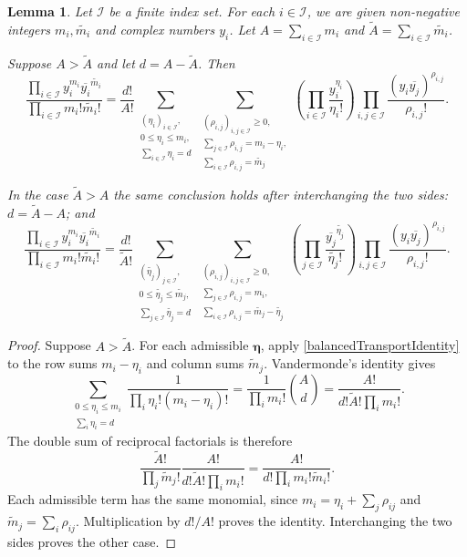 \documentclass[oneside, 12pt]{amsart}
\newtheorem{lem}[thm]{Lemma}
\theoremstyle{definition}
\begin{document}
	\begin{lem}\label{unbalancedTransportLemma}
		Let $\mathcal{I}$ be a finite index set. For each $i\in \mathcal{I}$, we are given non-negative integers $m_i, \widetilde{m_i}$ and complex numbers $y_i$. Let $A=\sum_{i \in \mathcal{I}} m_i$ and $\widetilde{A}=\sum_{i \in \mathcal{I}} \widetilde{m_i}$. 
		
		Suppose $A>\widetilde{A}$ and let $d=A-\widetilde{A}$. Then $$\frac{\prod_{i \in \mathcal{I}} y_i^{m_i}\overline{y_i}^{\widetilde{m_i}}}{\prod_{i \in \mathcal{I}} m_i!\widetilde{m_i}!}=\frac{d!}{A!}\sum_{\substack{(\eta_i)_{i \in \mathcal{I}}, \\ 0\leq \eta_i\leq m_i, \\ \sum_{i \in \mathcal{I}} \eta_i = d}} \sum_{\substack{(\rho_{i,j})_{i,j \in \mathcal{I}} \geq 0, \\ \sum_{j\in \mathcal{I}} \rho_{i,j}=m_i-\eta_i, \\ \sum_{i \in \mathcal{I}} \rho_{i,j} = \widetilde{m_j} }} \left(\prod_{i \in \mathcal{I}} \frac{y_i^{\eta_i}}{\eta_i!}\right) \prod_{i,j \in \mathcal{I}} \frac{(y_i\overline{y_j})^{\rho_{i,j}}}{\rho_{i,j}!}.$$
		
		In the case $\widetilde{A}>A$ the same conclusion holds {after interchanging the two sides}: $d=\widetilde{A}-A$; and $$\frac{\prod_{i \in \mathcal{I}} y_i^{m_i}\overline{y_i}^{\widetilde{m_i}}}{\prod_{i \in \mathcal{I}} m_i!\widetilde{m_i}!} = \frac{d!}{\widetilde{A}!} \sum_{\substack{(\widetilde{\eta_j})_{j \in \mathcal{I}}, \\ 0\leq \widetilde{\eta_j}\leq \widetilde{m_j}, \\ \sum_{j \in \mathcal{I}} \widetilde{\eta_j} = d}} \sum_{\substack{(\rho_{i,j})_{i,j \in \mathcal{I}} \geq 0, \\ \sum_{j\in \mathcal{I}} \rho_{i,j}=m_i, \\ \sum_{i \in \mathcal{I}} \rho_{i,j} = \widetilde{m_j} - \widetilde{\eta_j} }} \left(\prod_{j \in \mathcal{I}} \frac{\overline{y_j}^{\widetilde{\eta_j}}}{\widetilde{\eta_j}!}\right) \prod_{i,j \in \mathcal{I}} \frac{(y_i\overline{y_j})^{\rho_{i,j}}}{\rho_{i,j}!}.$$
	\end{lem}
	
	\begin{proof}
		Suppose $A>\widetilde A$.  For each admissible $\boldsymbol\eta$,
		apply \eqref{balancedTransportIdentity} to the row sums
		$m_i-\eta_i$ and column sums $\widetilde m_j$.
		Vandermonde's identity gives
		\[
		\sum_{\substack{0\leq\eta_i\leq m_i\\\sum_i\eta_i=d}}
		\frac1{\prod_i\eta_i!(m_i-\eta_i)!}
		=\frac1{\prod_i m_i!}\binom Ad
		=\frac{A!}{d!\widetilde A!\prod_i m_i!}.
		\]
		The double sum of reciprocal factorials is therefore
		\[
		\frac{\widetilde A!}{\prod_j\widetilde m_j!}
		\frac{A!}{d!\widetilde A!\prod_i m_i!}
		=\frac{A!}{d!\prod_i m_i!\widetilde m_i!}.
		\]
		Each admissible term has the same monomial, since
		$m_i=\eta_i+\sum_j\rho_{ij}$ and
		$\widetilde m_j=\sum_i\rho_{ij}$.
		Multiplication by $d!/A!$ proves the identity.
		Interchanging the two sides proves the other case.
	\end{proof}
	
\end{document}
